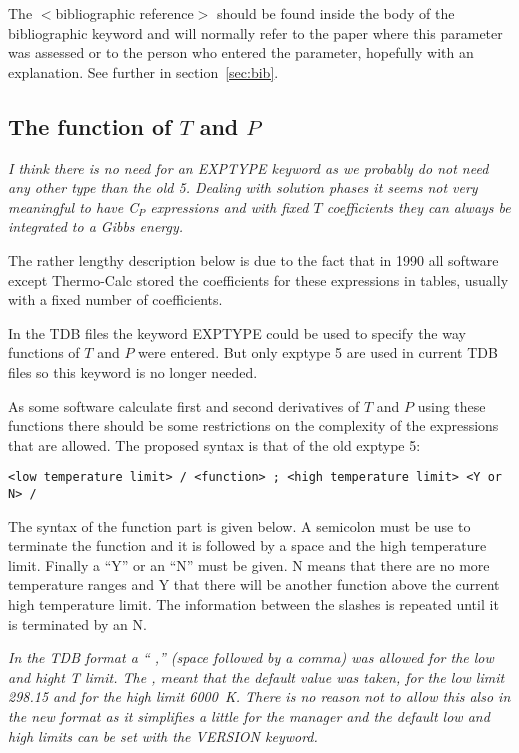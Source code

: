 \documentclass[12pt]{article}
\begin{document}
The $<$bibliographic reference$>$ should be found inside the body of
the bibliographic keyword and will normally refer to the paper where
this parameter was assessed or to the person who entered the
parameter, hopefully with an explanation.  See further in
section~\ref{sec:bib}.

\subsection{The function of $T$ and $P$}\label{sec:exptype}

{\em I think there is no need for an EXPTYPE keyword as we probably do
  not need any other type than the old 5.  Dealing with solution
  phases it seems not very meaningful to have C$_P$ expressions and
  with fixed $T$ coefficients they can always be integrated to a Gibbs
  energy.

  The rather lengthy description below is due to the fact that in 1990
  all software except Thermo-Calc stored the coefficients for these
  expressions in tables, usually with a fixed number of coefficients.}

In the TDB files the keyword EXPTYPE could be used to specify the way
functions of $T$ and $P$ were entered.  But only exptype 5 are used in
current TDB files so this keyword is no longer needed.

As some software calculate first and second derivatives of $T$ and $P$
using these functions there should be some restrictions on the
complexity of the expressions that are allowed.  The proposed syntax
is that of the old exptype 5:

\begin{verbatim}
<low temperature limit> / <function> ; <high temperature limit> <Y or N> /
\end{verbatim}

The syntax of the function part is given below.  A semicolon must be
use to terminate the function and it is followed by a space and the
high temperature limit.  Finally a ``Y'' or an ``N'' must be given.  N
means that there are no more temperature ranges and Y that there will
be another function above the current high temperature limit.  The
information between the slashes is repeated until it is terminated by
an N.

{\em In the TDB format a `` ,'' (space followed by a comma) was
  allowed for the low and hight T limit.  The , meant that the default
  value was taken, for the low limit 298.15 and for the high limit
  6000~K.  There is no reason not to allow this also in the new format
  as it simplifies a little for the manager and the default low and
  high limits can be set with the VERSION keyword.}
\end{document}
